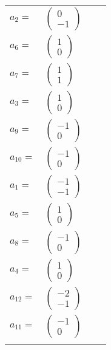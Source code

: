 \documentclass[1p]{elsarticle_modified}
\theoremstyle{definition}
\begin{document}
\begin{tabular}{m{7pt} m{180pt} m{7pt} m{180pt} }
\flushright $a_{2}=$&$\begin{pmatrix}0\\-1\end{pmatrix}$ \\
\flushright $a_{6}=$&$\begin{pmatrix}1\\0\end{pmatrix}$ \\
\flushright $a_{7}=$&$\begin{pmatrix}1\\1\end{pmatrix}$ \\
\flushright $a_{3}=$&$\begin{pmatrix}1\\0\end{pmatrix}$ \\
\flushright $a_{9}=$&$\begin{pmatrix}-1\\0\end{pmatrix}$ \\
\flushright $a_{10}=$&$\begin{pmatrix}-1\\0\end{pmatrix}$ \\
\flushright $a_{1}=$&$\begin{pmatrix}-1\\-1\end{pmatrix}$ \\
\flushright $a_{5}=$&$\begin{pmatrix}1\\0\end{pmatrix}$ \\
\flushright $a_{8}=$&$\begin{pmatrix}-1\\0\end{pmatrix}$ \\
\flushright $a_{4}=$&$\begin{pmatrix}1\\0\end{pmatrix}$ \\
\flushright $a_{12}=$&$\begin{pmatrix}-2\\-1\end{pmatrix}$ \\
\flushright $a_{11}=$&$\begin{pmatrix}-1\\0\end{pmatrix}$\\&\end{tabular}
\end{document}
